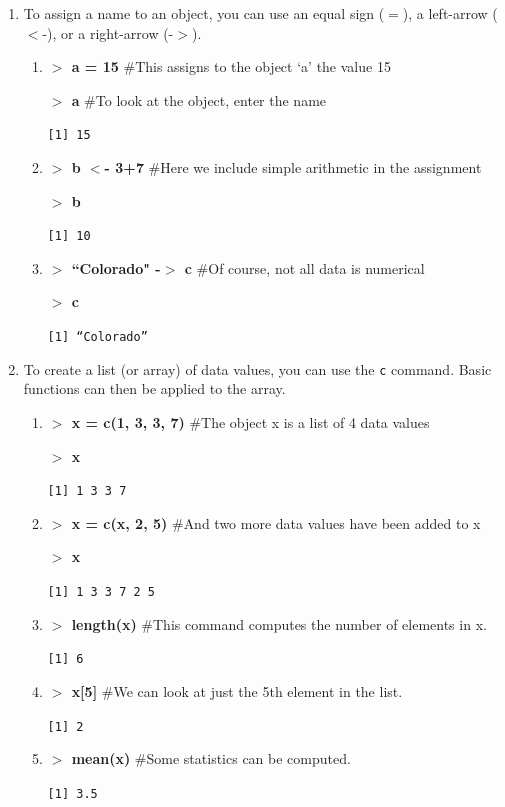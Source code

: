 \documentclass{article}
\newcommand{\Rin}[1]{\textbf{$>$ {#1}}}
\newcommand{\Rcom}[1]{\hspace{1cm} \#{#1}}
\newcommand{\Rout}[1]{\texttt{{#1}}}
\begin{document}
\begin{enumerate}
\item To assign a name to an object, you can use an equal sign ($=$), a left-arrow ($<$-), or a right-arrow (-$>$).
	\begin{enumerate}
	\item \Rin{a = 15} \Rcom{This assigns to the object `a' the value 15} 
	
	\Rin{a} \Rcom{To look at the object, enter the name} 
	
	\Rout{[1] 15} 
	
	\item \Rin{b $<$- 3+7} \Rcom{Here we include simple arithmetic in the assignment} 
	
	\Rin{b} 
	
	\Rout{[1] 10}
	
	\item \Rin{``Colorado" -$>$ c} \Rcom{Of course, not all data is numerical} 
	
	\Rin{c} 
	
	\Rout{[1] ``Colorado''}
	\end{enumerate}
	
\item To create a list (or array) of data values, you can use the \texttt{c} command.  Basic functions can then be applied to the array.

	\begin{enumerate}
	\item \Rin{x = c(1, 3, 3, 7)} \Rcom{The object x is a list of 4 data values} 
	
	\Rin{x} 
	
	\Rout{[1] 1 3 3 7}
	
	\item \Rin{x = c(x, 2, 5)} \Rcom{And two more data values have been added to x} 
	
	\Rin{x} 
	
	\Rout{[1] 1 3 3 7 2 5}
	\item \Rin{length(x)} \Rcom{This command computes the number of elements in x.} 
	
	\Rout{[1] 6}
	
	\item \Rin{x[5]} \Rcom{We can look at just the 5th element in the list.} 
	
	\Rout{[1] 2}
	
	\item \Rin{mean(x)} \Rcom{Some statistics can be computed.} 
	
	\Rout{[1] 3.5}
	

\end{enumerate}
\end{enumerate}
\end{document}
